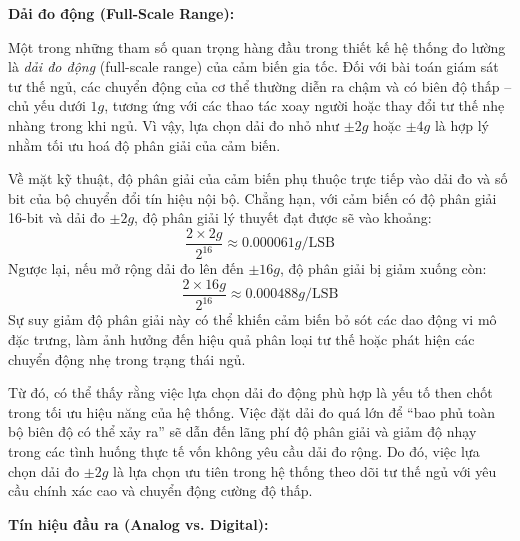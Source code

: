\textbf{Dải đo động (Full-Scale Range):}

Một trong những tham số quan trọng hàng đầu trong thiết kế hệ 
thống đo lường là \textit{dải đo động} (full-scale range) 
của cảm biến gia tốc. Đối với bài toán giám sát tư thế ngủ, 
các chuyển động của cơ thể thường diễn ra chậm và có biên độ 
thấp – chủ yếu dưới $1g$, tương ứng với các thao tác xoay người 
hoặc thay đổi tư thế nhẹ nhàng trong khi ngủ. 
Vì vậy, lựa chọn dải đo nhỏ như $\pm2g$ hoặc $\pm4g$ là hợp 
lý nhằm tối ưu hoá độ phân giải của cảm biến.

Về mặt kỹ thuật, độ phân giải của cảm biến phụ thuộc trực tiếp 
vào dải đo và số bit của bộ chuyển đổi tín hiệu nội bộ. 
Chẳng hạn, với cảm biến có độ phân giải 16-bit và dải 
đo $\pm2g$, độ phân giải lý thuyết đạt được sẽ vào khoảng:
\[
\frac{2 \times 2g}{2^{16}} \approx 0.000061g/\text{LSB}
\]
Ngược lại, nếu mở rộng dải đo lên đến $\pm16g$, 
độ phân giải bị giảm xuống còn:
\[
\frac{2 \times 16g}{2^{16}} \approx 0.000488g/\text{LSB}
\]
Sự suy giảm độ phân giải này có thể khiến cảm biến bỏ sót các 
dao động vi mô đặc trưng, 
làm ảnh hưởng đến hiệu quả phân loại tư thế hoặc phát hiện 
các chuyển động nhẹ trong trạng thái ngủ.

Từ đó, có thể thấy rằng việc lựa chọn dải đo động phù hợp 
là yếu tố then chốt trong tối ưu hiệu năng của hệ thống. 
Việc đặt dải đo quá lớn để “bao phủ toàn bộ biên độ có thể xảy ra” 
sẽ dẫn đến lãng phí độ phân giải và giảm độ nhạy trong các tình 
huống thực tế vốn không yêu cầu dải đo rộng. 
Do đó, việc lựa chọn dải đo $\pm2g$ là lựa chọn ưu tiên 
trong hệ thống theo dõi tư thế ngủ với yêu cầu chính xác 
cao và chuyển động cường độ thấp.

\textbf{Tín hiệu đầu ra (Analog vs. Digital):} 

